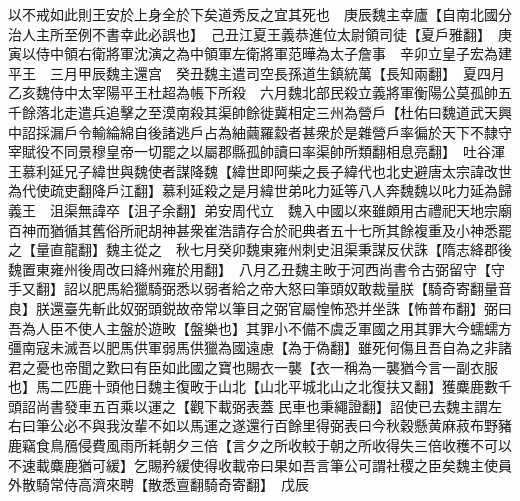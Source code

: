 以不戒如此則王安於上身全於下矣道秀反之宜其死也　庚辰魏主幸廬【自南北國分治人主所至例不書幸此必誤也】　己丑江夏王義恭進位太尉領司徒【夏戶雅翻】　庚寅以侍中領右衛將軍沈演之為中領軍左衛將軍范曄為太子詹事　辛卯立皇子宏為建平王　三月甲辰魏主還宫　癸丑魏主遣司空長孫道生鎮統萬【長知兩翻】　夏四月乙亥魏侍中太宰陽平王杜超為帳下所殺　六月魏北部民殺立義將軍衡陽公莫孤帥五千餘落北走遣兵追擊之至漠南殺其渠帥餘徙冀相定三州為營戶【杜佑曰魏道武天興中詔採漏戶令輸綸綿自後諸逃戶占為紬繭羅縠者甚衆於是雜營戶率徧於天下不隸守宰賦役不同景穆皇帝一切罷之以屬郡縣孤帥讀曰率渠帥所類翻相息亮翻】　吐谷渾王慕利延兄子緯世與魏使者謀降魏【緯世即阿柴之長子緯代也北史避唐太宗諱改世為代使疏吏翻降戶江翻】慕利延殺之是月緯世弟叱力延等八人奔魏魏以叱力延為歸義王　沮渠無諱卒【沮子余翻】弟安周代立　魏入中國以來雖頗用古禮祀天地宗廟百神而猶循其舊俗所祀胡神甚衆崔浩請存合於祀典者五十七所其餘複重及小神悉罷之【量直龍翻】魏主從之　秋七月癸卯魏東雍州刺史沮渠秉謀反伏誅【隋志絳郡後魏置東雍州後周改曰絳州雍於用翻】　八月乙丑魏主畋于河西尚書令古弼留守【守手又翻】詔以肥馬給獵騎弼悉以弱者給之帝大怒曰筆頭奴敢裁量朕【騎奇寄翻量音良】朕還臺先斬此奴弼頭鋭故帝常以筆目之弼官屬惶怖恐并坐誅【怖普布翻】弼曰吾為人臣不使人主盤於遊畋【盤樂也】其罪小不備不虞乏軍國之用其罪大今蠕蠕方彊南寇未滅吾以肥馬供軍弱馬供獵為國遠慮【為于偽翻】雖死何傷且吾自為之非諸君之憂也帝聞之歎曰有臣如此國之寶也賜衣一襲【衣一稱為一襲猶今言一副衣服也】馬二匹鹿十頭他日魏主復畋于山北【山北平城北山之北復扶又翻】獲麋鹿數千頭詔尚書發車五百乘以運之【觀下載弼表蓋民車也秉繩證翻】詔使已去魏主謂左右曰筆公必不與我汝輩不如以馬運之遂還行百餘里得弼表曰今秋穀懸黄麻菽布野豬鹿竊食鳥鴈侵費風雨所耗朝夕三倍【言夕之所收較于朝之所收得失三倍收穫不可以不速載麋鹿猶可緩】乞賜矜緩使得收載帝曰果如吾言筆公可謂社稷之臣矣魏主使員外散騎常侍高濟來聘【散悉亶翻騎奇寄翻】　戊辰

